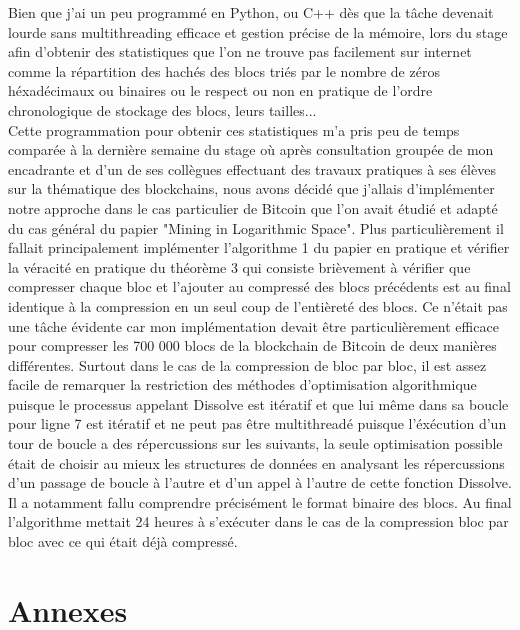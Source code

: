 \documentclass[12pt,a4paper]{article}
\begin{document}
	Bien que j'ai un peu programmé en Python, ou C++ dès que la tâche devenait lourde sans multithreading efficace et gestion précise de la mémoire, lors du stage afin d'obtenir des statistiques que l'on ne trouve pas facilement sur internet comme la répartition des hachés des blocs triés par le nombre de zéros héxadécimaux ou binaires ou le respect ou non en pratique de l'ordre chronologique de stockage des blocs, leurs tailles...\\
	Cette programmation pour obtenir ces statistiques m'a pris peu de temps comparée à la dernière semaine du stage où après consultation groupée de mon encadrante et d'un de ses collègues effectuant des travaux pratiques à ses élèves sur la thématique des blockchains, nous avons décidé que j'allais d'implémenter notre approche dans le cas particulier de Bitcoin que l'on avait étudié et adapté du cas général du papier "Mining in Logarithmic Space". Plus particulièrement il fallait principalement implémenter l'algorithme 1 du papier en pratique et vérifier la véracité en pratique du théorème 3 qui consiste brièvement à vérifier que compresser chaque bloc et l'ajouter au compressé des blocs précédents est au final identique à la compression en un seul coup de l'entièreté des blocs. Ce n'était pas une tâche évidente car mon implémentation devait être particulièrement efficace pour compresser les 700 000 blocs de la blockchain de Bitcoin de deux manières différentes. Surtout dans le cas de la compression de bloc par bloc, il est assez facile de remarquer la restriction des méthodes d'optimisation algorithmique puisque le processus appelant Dissolve est itératif et que lui même dans sa boucle pour ligne 7 est itératif et ne peut pas être multithreadé puisque l'éxécution d'un tour de boucle a des répercussions sur les suivants, la seule optimisation possible était de choisir au mieux les structures de données en analysant les répercussions d'un passage de boucle à l'autre et d'un appel à l'autre de cette fonction Dissolve. Il a notamment fallu comprendre précisément le format binaire des blocs. Au final l'algorithme mettait 24 heures à s'exécuter dans le cas de la compression bloc par bloc avec ce qui était déjà compressé. %
	
	\newpage
	
	\section{Annexes}
	
\end{document}
